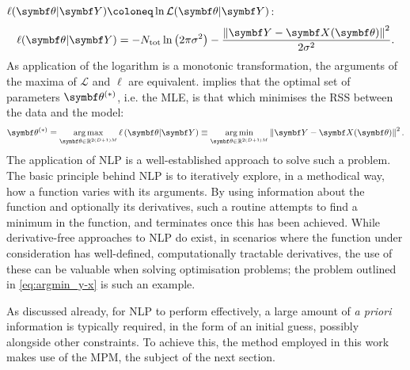 $\ell(\bth \vert \bY) \coloneq \ln \mathcal{L}(\bth \vert
\bY)$:
\begin{equation}
    \ell(\bth \vert \bY) =
        -N_{\text{tot}} \ln\left(2 \pi \sigma^2\right)
        -\frac{\left\lVert \bY - \bX(\bth) \right\rVert^2}{2\sigma^2}.
    \label{eq:log-likeihood}
\end{equation}
As application of the logarithm is a monotonic transformation, the
arguments of the maxima of $\mathcal{L}$ and $\ell$ are equivalent.
 implies that the optimal set of parameters
$\bth^{(*)}$, i.e. the \ac{MLE},
is that which minimises the \ac{RSS} between the data and the model:
\begin{equation}
    \bthstar = \argmax_{\bth \in \mathbb{R}^{2(D+1)M}}
        \ell\left(\bth \vert \bY\right) \equiv
        \argmin_{\bth \in \mathbb{R}^{2(D+1)M}} \left\lVert \bY - \bX(\bth) \right\rVert^2.
    \label{eq:argmin_y-x}
\end{equation}
The application of \ac{NLP} is a well-established approach to solve such a
problem\cite{Fletcher1987,Nocedal2006}. The basic principle behind \ac{NLP} is
to iteratively explore, in a methodical way, how a function varies with its
arguments. By using information about the function and optionally its
derivatives, such a routine attempts to find a minimum in the function, and
terminates once this has been achieved. While derivative-free approaches to
\ac{NLP} do exist\cite{Nelder1965,Kirkpatrick1983,Powell2009},
in scenarios where the function under consideration has well-defined,
computationally tractable derivatives, the use of these can be valuable when
solving optimisation problems; the problem outlined in
\cref{eq:argmin_y-x} is such an example.

As discussed already, for \ac{NLP} to perform effectively, a large amount of
\textit{a priori} information is typically required, in the form of an initial
guess, possibly alongside other constraints. To achieve this, the method
employed in this work makes use of the \ac{MPM}, the subject of the next
section.
